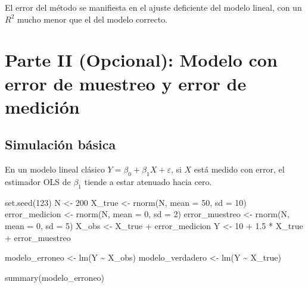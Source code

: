 \documentclass[
  spanish,
  letterpaper,
  DIV=11,
  numbers=noendperiod]{scrreprt}
\newenvironment{Shaded}{\begin{snugshade}}{\end{snugshade}}
\newcommand{\AttributeTok}[1]{\textcolor[rgb]{0.40,0.45,0.13}{#1}}
\newcommand{\DecValTok}[1]{\textcolor[rgb]{0.68,0.00,0.00}{#1}}
\newcommand{\FloatTok}[1]{\textcolor[rgb]{0.68,0.00,0.00}{#1}}
\newcommand{\FunctionTok}[1]{\textcolor[rgb]{0.28,0.35,0.67}{#1}}
\newcommand{\NormalTok}[1]{\textcolor[rgb]{0.00,0.23,0.31}{#1}}
\newcommand{\OtherTok}[1]{\textcolor[rgb]{0.00,0.23,0.31}{#1}}
\newcommand{\SpecialCharTok}[1]{\textcolor[rgb]{0.37,0.37,0.37}{#1}}
\begin{document}
El error del método se manifiesta en el ajuste deficiente del modelo
lineal, con un \(R^2\) mucho menor que el del modelo correcto.


\chapter{Parte II (Opcional): Modelo con error de muestreo y error de
medición}\label{parte-ii-opcional-modelo-con-error-de-muestreo-y-error-de-mediciuxf3n}

\section{Simulación básica}\label{simulaciuxf3n-buxe1sica}

En un modelo lineal clásico \(Y = \beta_0 + \beta_1 X + \varepsilon\),
si \(X\) está medido con error, el estimador OLS de \(\beta_1\) tiende a
estar atenuado hacia cero.

\begin{Shaded}
\begin{Highlighting}[]
\FunctionTok{set.seed}\NormalTok{(}\DecValTok{123}\NormalTok{)}
\NormalTok{N }\OtherTok{\textless{}{-}} \DecValTok{200}
\NormalTok{X\_true }\OtherTok{\textless{}{-}} \FunctionTok{rnorm}\NormalTok{(N, }\AttributeTok{mean =} \DecValTok{50}\NormalTok{, }\AttributeTok{sd =} \DecValTok{10}\NormalTok{)}
\NormalTok{error\_medicion }\OtherTok{\textless{}{-}} \FunctionTok{rnorm}\NormalTok{(N, }\AttributeTok{mean =} \DecValTok{0}\NormalTok{, }\AttributeTok{sd =} \DecValTok{2}\NormalTok{)}
\NormalTok{error\_muestreo }\OtherTok{\textless{}{-}} \FunctionTok{rnorm}\NormalTok{(N, }\AttributeTok{mean =} \DecValTok{0}\NormalTok{, }\AttributeTok{sd =} \DecValTok{5}\NormalTok{)}
\NormalTok{X\_obs }\OtherTok{\textless{}{-}}\NormalTok{ X\_true }\SpecialCharTok{+}\NormalTok{ error\_medicion}
\NormalTok{Y }\OtherTok{\textless{}{-}} \DecValTok{10} \SpecialCharTok{+} \FloatTok{1.5} \SpecialCharTok{*}\NormalTok{ X\_true }\SpecialCharTok{+}\NormalTok{ error\_muestreo}

\NormalTok{modelo\_erroneo }\OtherTok{\textless{}{-}} \FunctionTok{lm}\NormalTok{(Y }\SpecialCharTok{\textasciitilde{}}\NormalTok{ X\_obs)}
\NormalTok{modelo\_verdadero }\OtherTok{\textless{}{-}} \FunctionTok{lm}\NormalTok{(Y }\SpecialCharTok{\textasciitilde{}}\NormalTok{ X\_true)}

\FunctionTok{summary}\NormalTok{(modelo\_erroneo)}
\end{Highlighting}
\end{Shaded}
\end{document}
